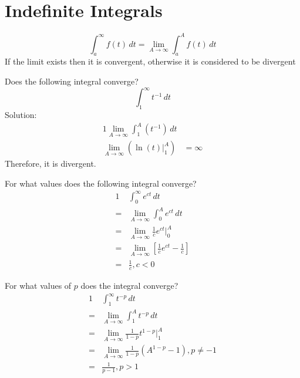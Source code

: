 \documentclass[twoside]{report}
\begin{document}
    \section{Indefinite Integrals}

    \begin{definition}
        \begin{equation}
            \int_{a}^{\infty}f(t)\,dt = \lim_{A\to\infty}\int_{a}^{A}f(t)\,dt
        \end{equation}
        If the limit exists then it is convergent, otherwise it is considered to be divergent
    \end{definition}
    \np
    \begin{example}
        Does the following integral converge?
        \begin{equation}
            \int_{1}^{\infty} t^{-1}\,dt
        \end{equation}
        Solution:
        \begin{alignat}{1}
            \lim_{A\to\infty}\int_{1}^{A}(t^{-1})\,dt&\\
            \lim_{A\to\infty}\left(\ln(t)|_{1}^{A}\right) &= \infty
        \end{alignat}
        Therefore, it is divergent.
    \end{example}
    \begin{example}
        For what values does the following integral converge?
        \begin{alignat}{1}
            &\int_{0}^{\infty}e^{ct}\,dt\\
            =&\lim_{A\to\infty}\int_{0}^{A}e^{ct}\,dt\\
            =&\lim_{A\to\infty}\frac{1}{c}e^{ct}\bigg|_{0}^{A}\\
            =&\lim_{A\to\infty}\left[\frac{1}{c}e^{ct}-\frac{1}{c}\right]\\
            =& \frac{1}{c}, c < 0
        \end{alignat}
    \end{example}
    \np
    \begin{example}
        For what values of $p$ does the integral converge?
        \begin{alignat}{1}
            &\int_{1}^{\infty}t^{-p}\,dt\\
            =&\lim_{A\to\infty}\int_{1}^{A}t^{-p}\,dt\\
            =&\lim_{A\to\infty}\frac{1}{1-p}t^{1-p}\bigg|_{1}^{A}\\
            =&\lim_{A\to\infty}\frac{1}{1-p}\left(A^{1-p}-1\right), p \neq -1\\
            =& \frac{1}{p - 1}, p > 1
        \end{alignat}
    \end{example}
\end{document}
